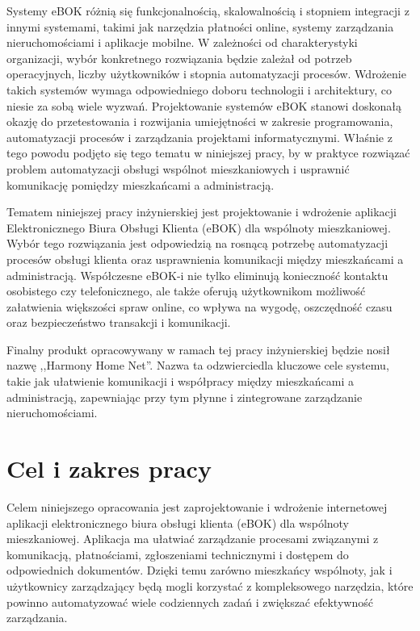 Systemy eBOK różnią się funkcjonalnością, skalowalnością i stopniem integracji z innymi systemami, takimi jak narzędzia płatności online, systemy zarządzania nieruchomościami i aplikacje mobilne. W zależności od charakterystyki organizacji, wybór konkretnego rozwiązania będzie zależał od potrzeb operacyjnych, liczby użytkowników i stopnia automatyzacji procesów. Wdrożenie takich systemów wymaga odpowiedniego doboru technologii i architektury, co niesie za sobą wiele wyzwań. Projektowanie systemów eBOK stanowi doskonałą okazję do przetestowania i rozwijania umiejętności w zakresie programowania, automatyzacji procesów i zarządzania projektami informatycznymi. Właśnie z tego powodu podjęto się tego tematu w niniejszej pracy, by w praktyce rozwiązać problem automatyzacji obsługi wspólnot mieszkaniowych i usprawnić komunikację pomiędzy mieszkańcami a administracją.

Tematem niniejszej pracy inżynierskiej jest projektowanie i wdrożenie aplikacji Elektronicznego Biura Obsługi Klienta (eBOK) dla wspólnoty mieszkaniowej. Wybór tego rozwiązania jest odpowiedzią na rosnącą potrzebę automatyzacji procesów obsługi klienta oraz usprawnienia komunikacji między mieszkańcami a administracją. Współczesne eBOK-i nie tylko eliminują konieczność kontaktu osobistego czy telefonicznego, ale także oferują użytkownikom możliwość załatwienia większości spraw online, co wpływa na wygodę, oszczędność czasu oraz bezpieczeństwo transakcji i komunikacji.

Finalny produkt opracowywany w ramach tej pracy inżynierskiej będzie nosił nazwę ,,Harmony Home Net''. Nazwa ta odzwierciedla kluczowe cele systemu, takie jak ułatwienie komunikacji i współpracy między mieszkańcami a administracją, zapewniając przy tym płynne i zintegrowane zarządzanie nieruchomościami.

\section{Cel i zakres pracy}

Celem niniejszego opracowania jest zaprojektowanie i wdrożenie internetowej aplikacji elektronicznego biura obsługi klienta (eBOK) dla wspólnoty mieszkaniowej. Aplikacja ma ułatwiać zarządzanie procesami związanymi z komunikacją, płatnościami, zgłoszeniami technicznymi i dostępem do odpowiednich dokumentów. Dzięki temu zarówno mieszkańcy wspólnoty, jak i użytkownicy zarządzający będą mogli korzystać z kompleksowego narzędzia, które powinno automatyzować wiele codziennych zadań i zwiększać efektywność zarządzania.

